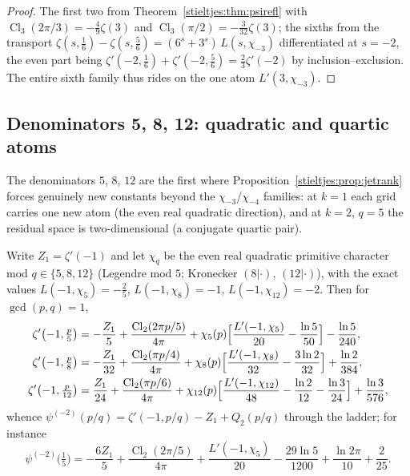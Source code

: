 \begin{proof}
The first two from Theorem~\ref{stieltjes:thm:psirefl} with
$\operatorname{Cl}_3(2\pi/3)=-\tfrac49\zeta(3)$ and
$\operatorname{Cl}_3(\pi/2)=-\tfrac3{32}\zeta(3)$; the sixths from the
transport $\zeta(s,\tfrac16)-\zeta(s,\tfrac56)=(6^s+3^s)\,L(s,\chi_{-3})$
differentiated at $s=-2$, the even part being
$\zeta'(-2,\tfrac16)+\zeta'(-2,\tfrac56)=\tfrac23\zeta'(-2)$ by
inclusion--exclusion. The entire sixth family thus rides on the one atom
$L'(3,\chi_{-3})$.
\end{proof}

\subsection{Denominators 5, 8, 12: quadratic and quartic atoms}
\label{stieltjes:sec:negq5812}

The denominators $5$, $8$, $12$ are the first where
Proposition~\ref{stieltjes:prop:jetrank} forces genuinely new constants beyond the
$\chi_{-3}$/$\chi_{-4}$ families: at $k=1$ each grid carries one new atom
(the even real quadratic direction), and at $k=2$, $q=5$ the residual
space is two-dimensional (a conjugate quartic pair).

\begin{theorem}[the $k=1$ grids]\label{stieltjes:thm:negq5812}
Write $Z_1=\zeta'(-1)$ and let $\chi_q$ be the even real quadratic
primitive character mod $q\in\{5,8,12\}$ (Legendre mod $5$; Kronecker
$(8|\cdot)$, $(12|\cdot)$), with the exact values
$L(-1,\chi_5)=-\tfrac25$, $L(-1,\chi_8)=-1$, $L(-1,\chi_{12})=-2$. Then
for $\gcd(p,q)=1$,
\begin{align*}
\zeta'\bigl(-1,\tfrac p5\bigr)
&=-\frac{Z_1}{5}+\frac{\operatorname{Cl}_2(2\pi p/5)}{4\pi}
+\chi_5(p)\Bigl[\frac{L'(-1,\chi_5)}{20}-\frac{\ln5}{50}\Bigr]
-\frac{\ln5}{240},\\
\zeta'\bigl(-1,\tfrac p8\bigr)
&=-\frac{Z_1}{32}+\frac{\operatorname{Cl}_2(\pi p/4)}{4\pi}
+\chi_8(p)\Bigl[\frac{L'(-1,\chi_8)}{32}-\frac{3\ln2}{32}\Bigr]
+\frac{\ln2}{384},\\
\zeta'\bigl(-1,\tfrac p{12}\bigr)
&=\frac{Z_1}{24}+\frac{\operatorname{Cl}_2(\pi p/6)}{4\pi}
+\chi_{12}(p)\Bigl[\frac{L'(-1,\chi_{12})}{48}-\frac{\ln2}{12}
-\frac{\ln3}{24}\Bigr]
+\frac{\ln3}{576},
\end{align*}
whence $\psi^{(-2)}(p/q)=\zeta'(-1,p/q)-Z_1+Q_2(p/q)$ through the ladder;
for instance
\[
\psi^{(-2)}\bigl(\tfrac15\bigr)
=-\frac{6Z_1}{5}+\frac{\operatorname{Cl}_2(2\pi/5)}{4\pi}
+\frac{L'(-1,\chi_5)}{20}-\frac{29\ln5}{1200}+\frac{\ln2\pi}{10}
+\frac2{25}.
\]
\end{theorem}

